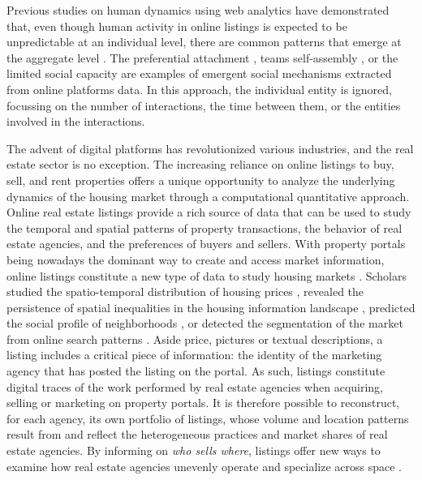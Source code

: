 Previous studies on human dynamics using web analytics have demonstrated that, even though human activity in online listings is expected to be unpredictable at an individual level, there are common patterns that emerge at the aggregate level \cite{Lazer2009CompSocSci}. The preferential attachment \cite{barabasi1999emergence,goncalves-2008}, teams self-assembly \cite{guimera-2005}, or the limited social capacity \cite{goncalves-2011,dunbar-2012} are examples of emergent social mechanisms extracted from online platforms data. In this approach, the individual entity is ignored, focussing on the number of interactions, the time between them, or the entities involved in the interactions.

The advent of digital platforms has revolutionized various industries, and the real estate sector is no exception. The increasing reliance on online listings to buy, sell, and rent properties offers a unique opportunity to analyze the underlying dynamics of the housing market through a computational quantitative approach. Online real estate listings provide a rich source of data that can be used to study the temporal and spatial patterns of property transactions, the behavior of real estate agencies, and the preferences of buyers and sellers. With property portals being nowadays the dominant way to create and access market information, online listings constitute a new type of data to study housing markets \cite{sawyer1999ict, boeing2017new, boulay2021moving}. Scholars studied the spatio-temporal distribution of housing prices \cite{yao2018mapping,adolfsen_segmentation_2022}, revealed the persistence of spatial inequalities in the housing information landscape \cite{boeing2020online}, predicted the social profile of neighborhoods \cite{delmelle2021language}, or detected the segmentation of the market from online search patterns \cite{rae2015online}.
Aside price, pictures or textual descriptions, a listing includes a critical piece of information: the identity of the marketing agency that has posted the listing on the portal. As such, listings constitute digital traces \cite{salganikbit2017} of the work performed by real estate agencies when acquiring, selling or marketing on property portals. It is therefore possible to reconstruct, for each agency, its own portfolio of listings, whose volume and location patterns result from and reflect the heterogeneous practices and market shares of real estate agencies. By informing on \textit{who sells where}, listings offer new ways to examine how real estate agencies unevenly operate and specialize across space \cite{palm1976RealEstate}.


